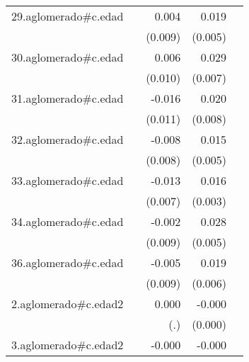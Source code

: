 {\begin{longtable}{l*{4}{D{.}{.}{-1}}}
\addlinespace
29.aglomerado#c.edad&                     &       0.004         &       0.019\sym{***}&                     \\
            &                     &     (0.009)         &     (0.005)         &                     \\
\addlinespace
30.aglomerado#c.edad&                     &       0.006         &       0.029\sym{***}&                     \\
            &                     &     (0.010)         &     (0.007)         &                     \\
\addlinespace
31.aglomerado#c.edad&                     &      -0.016         &       0.020\sym{*}  &                     \\
            &                     &     (0.011)         &     (0.008)         &                     \\
\addlinespace
32.aglomerado#c.edad&                     &      -0.008         &       0.015\sym{**} &                     \\
            &                     &     (0.008)         &     (0.005)         &                     \\
\addlinespace
33.aglomerado#c.edad&                     &      -0.013         &       0.016\sym{***}&                     \\
            &                     &     (0.007)         &     (0.003)         &                     \\
\addlinespace
34.aglomerado#c.edad&                     &      -0.002         &       0.028\sym{***}&                     \\
            &                     &     (0.009)         &     (0.005)         &                     \\
\addlinespace
36.aglomerado#c.edad&                     &      -0.005         &       0.019\sym{**} &                     \\
            &                     &     (0.009)         &     (0.006)         &                     \\
\addlinespace
2.aglomerado#c.edad2&                     &       0.000         &      -0.000         &                     \\
            &                     &         (.)         &     (0.000)         &                     \\
\addlinespace
3.aglomerado#c.edad2&                     &      -0.000         &      -0.000\sym{***}&                     \\

\end{longtable}}
